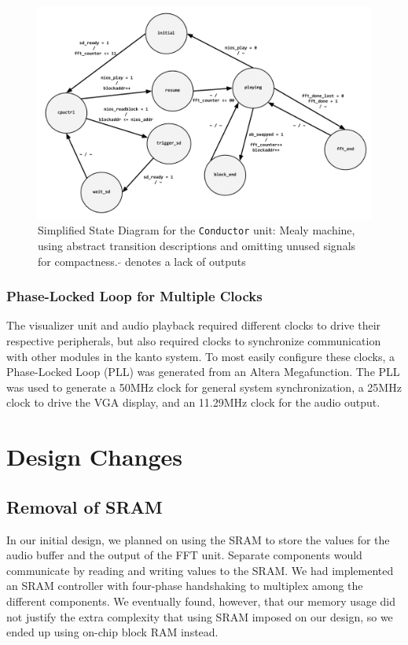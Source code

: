 \documentclass{article}
\begin{document}
\begin{figure}[H]
  \centering
    \includegraphics[width=6in]{conductor_state}
  \caption{Simplified State Diagram for the \texttt{Conductor} unit:
    Mealy machine, using abstract transition descriptions and omitting unused
    signals for compactness. \(\widetilde{}\)   denotes a lack of outputs}
\end{figure}

\subsubsection{Phase-Locked Loop for Multiple Clocks}
The visualizer unit and audio playback required different clocks to drive their
respective peripherals, but also required clocks to synchronize communication
with other modules in the kanto system. To most easily configure these clocks,
a Phase-Locked Loop (PLL) was generated from an Altera Megafunction. The PLL
was used to generate a 50MHz clock for general system synchronization, a 25MHz
clock to drive the VGA display, and an 11.29MHz clock for the audio output.

\section{Design Changes}
\subsection{Removal of SRAM}

In our initial design, we planned on using the SRAM to store the values for the audio 
buffer and the output of the FFT unit. Separate components would communicate by 
reading and writing values to the SRAM. We had implemented an SRAM controller 
with four-phase handshaking to multiplex among the different components. We 
eventually found, however, that our memory usage did not justify the extra complexity 
that using SRAM imposed on our design, so we ended up using on-chip block RAM 
instead.
\end{document}
